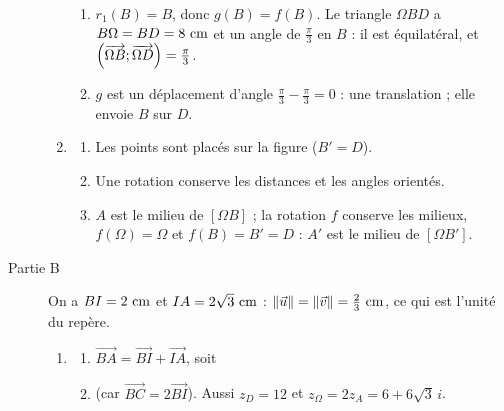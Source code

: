 \begin{description}
\begin{enumerate}
		\begin{enumerate}
			\item {}
				$r_1(B) = B$, donc $g(B) = f(B)$. Le triangle $\Omega BD$ a $B\Omega = BD = 8\cm$ et un angle de $\frac{\pi}{3}$ en $B$ : il est équilatéral, et $\Angl{\Omega B}{\Omega D} = \frac{\pi}{3}$.
				\par\noindent{}
			\item {}
				$g$ est un déplacement d'angle $\frac{\pi}{3} - \frac{\pi}{3} = 0$ : une translation ; elle envoie $B$ sur $D$.
				\par\noindent{}
		\end{enumerate}
		\item
		\begin{enumerate}
			\item Les points sont placés sur la figure ($B' = D$).
			\item {}
				Une rotation conserve les distances et les angles orientés.
				\par\noindent{}
			\item {}
				$A$ est le milieu de $[\Omega B]$ ; la rotation $f$ conserve les milieux, $f(\Omega) = \Omega$ et $f(B) = B' = D$ : $A'$ est le milieu de $[\Omega B']$.
				\par\noindent{}
		\end{enumerate}
	\end{enumerate}
	\item[Partie B] On a $BI = 2~\mathrm{cm}$ et $IA = 2\sqrt{3}~\mathrm{cm}$ : $\|\vec{u}\| = \|\vec{v}\| = \frac{2}{3}~\mathrm{cm}$, ce qui est l'unité du repère.
	\begin{enumerate}
		\item
		\begin{enumerate}
			\item {}
				$\overrightarrow{BA} = \overrightarrow{BI} + \overrightarrow{IA}$, soit \par\noindent{}
			\item {}
				 (car $\overrightarrow{BC} = 2\overrightarrow{BI}$). Aussi $z_D = 12$ et $z_\Omega = 2z_A = 6 + 6\sqrt{3}\,i$.
		\end{enumerate}

\end{enumerate}
\end{description}

